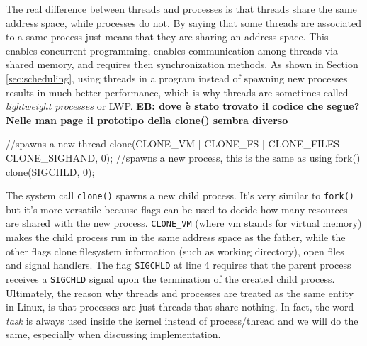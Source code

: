 \documentclass[10pt]{book}
\newcommand{\mycomment}[1]{\textbf{#1}}  %
\begin{document}
The real difference between threads and processes is that threads share the same address space, while processes do not. By saying that some threads are associated to a same process just means that they are sharing an address space. This enables concurrent programming, enables communication among threads via shared memory, and requires then synchronization methods. As shown in Section \ref{sec:scheduling},
using threads in a program instead of spawning new processes results in much better performance, which is why threads are sometimes called \textit{lightweight processes} or LWP. %
\mycomment{EB: dove \`e stato trovato il codice che segue? Nelle man page il prototipo della clone() sembra diverso}
\begin{code}
//spawns a new thread
clone(CLONE_VM | CLONE_FS | CLONE_FILES | CLONE_SIGHAND, 0); 
//spawns a new process, this is the same as using fork()
clone(SIGCHLD, 0); 
\end{code}
The system call \verb|clone()| spawns a new child process. It's very
similar to \verb|fork()| but it's more versatile because flags can be
used to decide how many resources are shared with the new
process. \verb|CLONE_VM| (where vm stands for virtual memory) makes
the child process run in the same address space as the father, while
the other flags clone filesystem information (such as working
directory), open files and signal handlers. The flag \verb|SIGCHLD| at
line 4 requires that the parent process receives a \texttt{SIGCHLD}
signal upon the termination of the created child process.  Ultimately,
the reason why threads and processes are treated as the same entity in
Linux, is that processes are just threads that share nothing. In fact,
the word \textit{task} is always used inside the kernel instead of
process/thread and we will do the same, especially when discussing
implementation.
\end{document}
